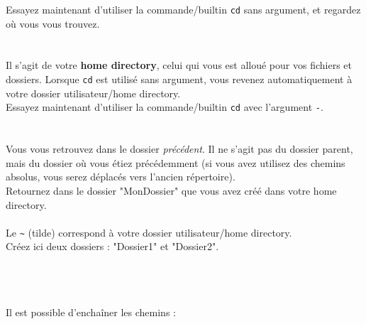 Essayez maintenant d'utiliser la commande/builtin \texttt{cd} sans argument, et regardez où vous vous trouvez.\\

\\
\\

Il s'agit de votre \textbf{home directory}, celui qui vous est alloué pour vos fichiers et dossiers.
Lorsque \texttt{cd} est utilisé sans argument, vous revenez automatiquement à votre dossier utilisateur/home directory.\\
Essayez maintenant d'utiliser la commande/builtin \texttt{cd} avec l'argument \texttt{-}.\\

\\
\\

Vous vous retrouvez dans le dossier \textit{précédent}.
Il ne s'agit pas du dossier parent, mais du dossier où vous étiez précédemment (si vous avez utilisez des chemins absolus, vous serez déplacés vers l'ancien répertoire).\\

Retournez dans le dossier "MonDossier" que vous avez créé dans votre home directory.\\

\\

Le \texttt{\textasciitilde} (tilde) correspond à votre dossier utilisateur/home directory.\\

Créez ici deux dossiers : "Dossier1" et "Dossier2".\\

\\
\\
\\

\bigskip

Il est possible d'enchaîner les chemins :\\

\\
\\
\\
\\

\bigskip


\newpage
